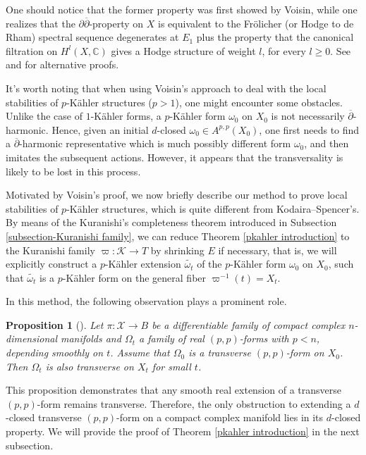 \documentclass[12pt]{amsart}
\numberwithin{equation}{section}
\newtheorem{proposition}[theorem]{Proposition}
\theoremstyle{definition}
\theoremstyle{definition}
\theoremstyle{definition}
\renewcommand{\1}{\mathsf{1}}
\renewcommand{\>}{\rightarrow}
\newcommand{\p}{\partial}
\newcommand{\bp}{\overline\partial}
\def\p{\partial}
\def\mb{\mathbb}
\def\mc{\mathcal}
\theoremstyle{plain} %
\theoremstyle{plain} %
\theoremstyle{plain} %
\begin{document}
    One should notice that the former  property was first showed by Voisin, while one realizes that the $\p\bp$-property on $X$ is equivalent to the Fr\"{o}licher (or Hodge to de Rham) spectral sequence degenerates at $E_1$ plus the property that the canonical filtration on $H^l (X,\mb C)$ gives a Hodge structure of weight $l$, for every $l\geq 0$. See \cite[Theorem 5.12]{Wu06} and \cite[Corollary 3.7]{AT13} for alternative proofs.
	
	
	It's worth noting that when using Voisin's approach to deal with the local stabilities of $p$-K\"{a}hler structures ($p>1$), one might encounter some obstacles.  Unlike the case of $1$-K\"ahler forms, a $p$-K\"ahler form $\omega_{0}$ on $X_0$ is not necessarily $\bp$-harmonic.  Hence,  given an initial $d$-closed  $\omega_{0}\in A^{p,p}(X_0)$, one first needs to find a $\bp$-harmonic representative which is much possibly different form $\omega_0$, and then imitates the subsequent actions. However, it appears that the transversality is likely to be lost in this process.
	
	Motivated by Voisin's proof,  we now briefly describe our method to prove local stabilities of $p$-K\"{a}hler structures, which is quite different from Kodaira--Spencer's. By means of the Kuranishi's completeness theorem  introduced in Subsection \ref{subsection-Kuranishi family}, we can reduce Theorem \ref{pkahler introduction}  to the  Kuranishi family  $\varpi:\mc{K}\to T$ by shrinking $E$ if necessary, that is, we will explicitly construct a  $p$-K\"{a}hler extension
	$\widetilde{\omega_t}$ of the $p$-K\"{a}hler form $\omega_0$ on $X_0$, such that $\widetilde{\omega_t}$ is a
	$p$-K\"{a}hler form on the general fiber $\varpi^{-1}(t)=X_t$. %
	
	In this method, the following observation plays a prominent role.
	\begin{proposition}[{\cite[Proposition 4.12]{RWZ21}}]\label{ext-trans}
		Let $\pi: \mathcal{X} \> B$ be a  differentiable family of compact complex $n$-dimensional manifolds and
		$\Omega_t$  a family of real $(p,p)$-forms with $p< n$, depending smoothly on $t$. Assume that
		$\Omega_0$ is a transverse $(p,p)$-form on $X_0$. Then $\Omega_t$ is also transverse on $X_t$ for small $t$.
	\end{proposition}
	
	This proposition demonstrates that any smooth real extension of a transverse $(p,p)$-form remains transverse. Therefore, the only obstruction to extending a $d$-closed transverse $(p,p)$-form on a compact complex manifold lies in its $d$-closed property. We will provide the proof of Theorem \ref{pkahler introduction}  in the next subsection.
	
\end{document}
